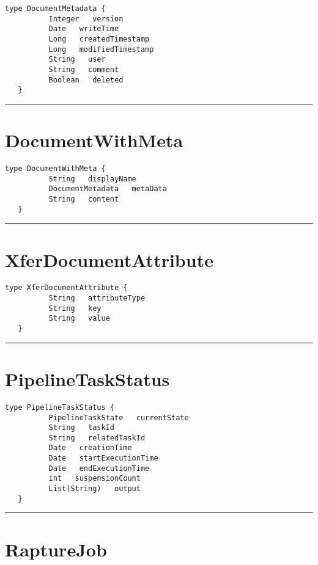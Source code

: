 \begin{lstlisting}[style=nonumbers]
   type DocumentMetadata {
          Integer   version
          Date   writeTime
          Long   createdTimestamp
          Long   modifiedTimestamp
          String   user
          String   comment
          Boolean   deleted
   }
\end{lstlisting}

\rule{12cm}{2pt}
\section{DocumentWithMeta}
\label{type:DocumentWithMeta}

\begin{lstlisting}[style=nonumbers]
   type DocumentWithMeta {
          String   displayName
          DocumentMetadata   metaData
          String   content
   }
\end{lstlisting}

\rule{12cm}{2pt}
\section{XferDocumentAttribute}
\label{type:XferDocumentAttribute}

\begin{lstlisting}[style=nonumbers]
   type XferDocumentAttribute {
          String   attributeType
          String   key
          String   value
   }
\end{lstlisting}

\rule{12cm}{2pt}
\section{PipelineTaskStatus}
\label{type:PipelineTaskStatus}

\begin{lstlisting}[style=nonumbers]
   type PipelineTaskStatus {
          PipelineTaskState   currentState
          String   taskId
          String   relatedTaskId
          Date   creationTime
          Date   startExecutionTime
          Date   endExecutionTime
          int   suspensionCount
          List(String)   output
   }
\end{lstlisting}

\rule{12cm}{2pt}
\section{RaptureJob}
\label{type:RaptureJob}

